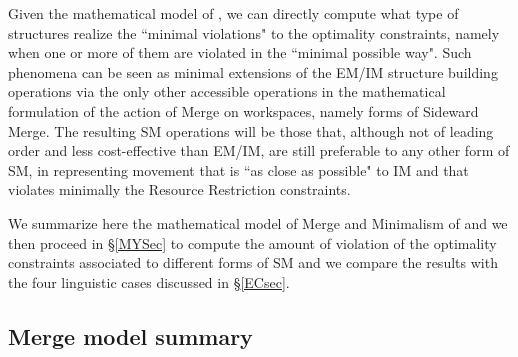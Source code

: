 \documentclass[12pt]{amsart}
\numberwithin{equation}{section}
\begin{document}
\smallskip

Given the mathematical model of \cite{MCB}, we can directly compute 
what type of structures realize the ``minimal violations" to the optimality 
constraints, namely when one or more of them are violated in the ``minimal possible way".
Such phenomena can be seen as minimal extensions of the EM/IM
structure building operations via the only other accessible operations in
the mathematical formulation of the action of Merge on workspaces, namely
forms of Sideward Merge. The resulting SM operations will be those that,
although not of leading order and less cost-effective than EM/IM, are still preferable 
to any other form of SM, in representing movement that is ``as close as possible" 
to IM and that violates minimally the Resource Restriction constraints. 

\smallskip

We summarize here the mathematical model of Merge and Minimalism
of \cite{MCB} and we then proceed in \S \ref{MYSec}
to compute the amount of violation of the optimality constraints 
associated to different forms of SM and we compare the results with
the four linguistic cases discussed in \S \ref{ECsec}.

\smallskip
\subsection{Merge model summary}
\end{document}
